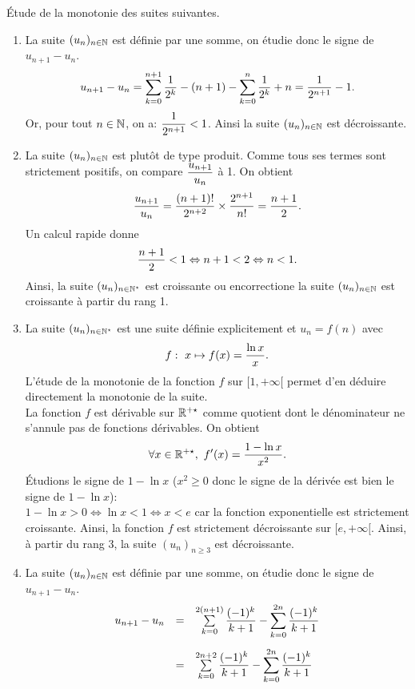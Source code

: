 \documentclass[a4paper, 11pt]{article}
\begin{document}
\begin{correction} \;
\'Etude de la monotonie des suites suivantes.
\begin{enumerate}
\item La suite $\suiteu$ est d\'efinie par une somme, on \'etudie donc le signe de $u_{n+1}-u_n$.
$$u_{n+1}-u_n=\sum\limits_{k=0}^{n+1}\ddp\frac{1}{2^k}-(n+1)-\sum\limits_{k=0}^{n}\ddp\frac{1}{2^k}+n=\ddp\frac{1}{2^{n+1}}-1.$$
Or, pour tout $n\in\N$, on a: $\ddp\frac{1}{2^{n+1}}<1$. Ainsi la suite $\suiteu$ est d\'ecroissante.
\item La suite $\suiteu$ est plut\^ot de type produit. Comme tous ses termes sont strictement positifs, on compare $\ddp\frac{u_{n+1}}{u_n}$ \`a 1. On obtient
$$\ddp\frac{u_{n+1}}{u_n}=\ddp\frac{(n+1)!}{2^{n+2}} \times \ddp\frac{2^{n+1}}{n!}=\ddp\frac{n+1}{2}.$$
Un calcul rapide donne
$$\ddp\frac{n+1}{2}<1\Leftrightarrow n+1<2\Leftrightarrow n<1.$$
Ainsi, la suite $(u_n)_{n\in\N^{\star}}$ est croissante ou encorrectione la suite $\suiteu$ est croissante \`{a} partir du rang 1.
\item 
La suite $(u_n)_{n\in\N^{\star}}$ est une suite d\'efinie explicitement et $u_n=f(n)$ avec
$$f:\ x\mapsto f(x)=\ddp\frac{\ln{x}}{x}.$$
L'\'etude de la monotonie de la fonction $f$ sur $\lbrack 1,+\infty\lbrack$ permet d'en d\'eduire directement la monotonie de la suite.\\
\noindent La fonction $f$ est d\'erivable sur $\R^{+\star}$ comme quotient dont le d\'enominateur ne s'annule pas de fonctions d\'erivables. On obtient
$$\forall x\in\R^{+\star},\ f^{\prime}(x)=\ddp\frac{1-\ln{x}}{x^2}.$$
\'Etudions le signe de $1-\ln{x}$ ($x^2\geq 0$ donc le signe de la d\'eriv\'ee est bien le signe de $1-\ln{x}$):\\
\noindent $1-\ln{x}>0  \Leftrightarrow  \ln{x}<1
\Leftrightarrow x<e $ car la fonction exponentielle est strictement croissante.
Ainsi, la fonction $f$ est strictement d\'ecroissante sur $\lbrack e,+\infty\lbrack$. Ainsi, \`a partir du rang 3, la suite $(u_n)_{n\geq 3}$ est d\'ecroissante.
\item La suite $\suiteu$ est d\'efinie par une somme, on \'etudie donc le signe de $u_{n+1}-u_n$.
$$\begin{array}{lll}
u_{n+1}-u_n&=&\sum\limits_{k=0}^{2(n+1)}\ddp\frac{(-1)^k}{k+1}-\sum\limits_{k=0}^{2n}\ddp\frac{(-1)^k}{k+1}\vsec\\
&=& \sum\limits_{k=0}^{2n+2}\ddp\frac{(-1)^k}{k+1}-\sum\limits_{k=0}^{2n}\ddp\frac{(-1)^k}{k+1}\vsec\\

\end{array}$$
\end{enumerate}
\end{correction}
\end{document}
